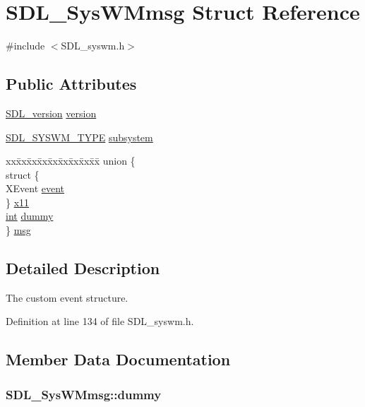 \hypertarget{struct_s_d_l___sys_w_mmsg}{\section{S\-D\-L\-\_\-\-Sys\-W\-Mmsg Struct Reference}
\label{struct_s_d_l___sys_w_mmsg}
}


{\ttfamily \#include $<$S\-D\-L\-\_\-syswm.\-h$>$}

\subsection*{Public Attributes}
\begin{DoxyCompactItemize}
\item 
\hyperlink{struct_s_d_l__version}{S\-D\-L\-\_\-version} \hyperlink{struct_s_d_l___sys_w_mmsg_a95f9aae58d18ee8fac556416b322a5fb}{version}
\item 
\hyperlink{_s_d_l__syswm_8h_a064c26598287280fff2a00d6758ac4f7}{S\-D\-L\-\_\-\-S\-Y\-S\-W\-M\-\_\-\-T\-Y\-P\-E} \hyperlink{struct_s_d_l___sys_w_mmsg_a7c3900af5ea797f1318fc77ee0ecd11b}{subsystem}
\item 
\begin{tabbing}
xx\=xx\=xx\=xx\=xx\=xx\=xx\=xx\=xx\=\kill
union \{\\
\>struct \{\\
\>\>XEvent \hyperlink{struct_s_d_l___sys_w_mmsg_ae32f04e3b3707a452cbb4ed416d56c64}{event}\\
\>\} \hyperlink{struct_s_d_l___sys_w_mmsg_ac60fef6de87deff6fe9cf4f49f9ff96c}{x11}\\
\>\hyperlink{_s_d_l__thread_8h_a6a64f9be4433e4de6e2f2f548cf3c08e}{int} \hyperlink{struct_s_d_l___sys_w_mmsg_a8faf13f90f2477157b42b631308cd900}{dummy}\\
\} \hyperlink{struct_s_d_l___sys_w_mmsg_a76c9fec05f26001312055dce455e0b76}{msg}\\

\end{tabbing}\end{DoxyCompactItemize}


\subsection{Detailed Description}
The custom event structure. 

Definition at line 134 of file S\-D\-L\-\_\-syswm.\-h.



\subsection{Member Data Documentation}
\hypertarget{struct_s_d_l___sys_w_mmsg_a8faf13f90f2477157b42b631308cd900}{
\subsubsection[{dummy}]{ S\-D\-L\-\_\-\-Sys\-W\-Mmsg\-::dummy}}\label{struct_s_d_l___sys_w_mmsg_a8faf13f90f2477157b42b631308cd900}


